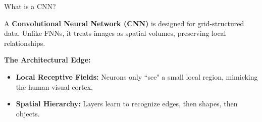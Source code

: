 \documentclass[aspectratio=169,xcolor=dvipsnames,svgnames,x11names,fleqn]{beamer}
\begin{document}
\begin{frame}[fragile]{What is a CNN?}
    \begin{tcolorbox}[colback=mainBlue, colframe=neonBlue, fonttitle=\bfseries, title=Beyond Flattening]
        \color{white}\small
        A \textbf{Convolutional Neural Network (CNN)} is designed for grid-structured data. Unlike FNNs, it treats images as spatial volumes, preserving local relationships.
    \end{tcolorbox}

    \vspace{0.3cm}
    
    \textbf{The Architectural Edge:}
    \begin{itemize}
        \item \textcolor{mainBlue}{\textbf{Local Receptive Fields:}} Neurons only ``see" a small local region, mimicking the human visual cortex.
        \item \textcolor{mainBlue}{\textbf{Spatial Hierarchy:}} Layers learn to recognize edges, then shapes, then objects.
    \end{itemize}

    \vfill
    \centering
\end{frame}
\end{document}
